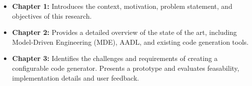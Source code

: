 \begin{itemize}
	\item \textbf{Chapter 1:} Introduces the context, motivation, problem statement, and objectives of this research.
	\item \textbf{Chapter 2:} Provides a detailed overview of the state of the art, including Model-Driven Engineering (MDE), AADL, and existing code generation tools.
	\item \textbf{Chapter 3:} Identifies the challenges and requirements of creating a configurable code generator. Presents a prototype and evaluates feasability, implementation details and user feedback.
\end{itemize}










